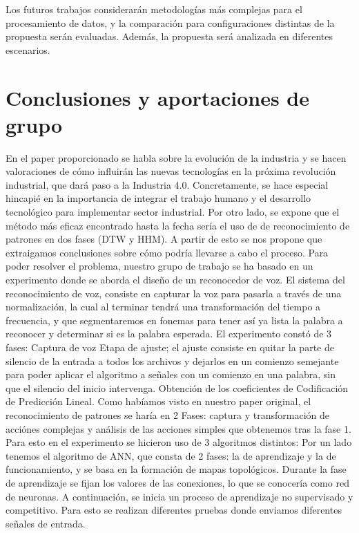 \documentclass{article}
\begin{document}
  Los futuros trabajos considerarán metodologías más complejas para el procesamiento de datos, y la comparación para configuraciones distintas de la propuesta serán evaluadas.
Además, la propuesta será analizada en diferentes escenarios.

\section {Conclusiones y aportaciones de grupo}
En el paper proporcionado se habla sobre la evolución de la industria y se hacen valoraciones de cómo influirán las nuevas tecnologías en la próxima revolución industrial, que dará paso a la Industria 4.0.
 Concretamente, se hace especial hincapié en la importancia de integrar el trabajo humano y el desarrollo tecnológico para implementar sector industrial.
Por otro lado, se expone que el método más eficaz encontrado hasta la fecha sería el uso de de reconocimiento de patrones en dos fases (DTW y HHM).
A partir de esto se nos propone que extraigamos conclusiones sobre cómo podría llevarse a cabo el proceso. 
Para poder resolver el problema, nuestro grupo de trabajo se ha basado en un experimento donde se aborda el diseño de un reconocedor de voz. 
El sistema del reconocimiento de voz, consiste en capturar la voz para pasarla a través de una normalización, la cual al terminar tendrá una transformación del tiempo a frecuencia, y que segmentaremos en fonemas para tener así ya lista la palabra a reconocer y determinar si es la palabra esperada. 
El experimento constó de 3 fases: 
Captura de voz
Etapa de ajuste; el ajuste consiste en quitar la parte de silencio de la entrada a todos los archivos y dejarlos en un comienzo semejante para poder aplicar el algoritmo a señales con un comienzo en una palabra, sin que el silencio del inicio intervenga. 
Obtención de los  coeficientes de Codificación de Predicción Lineal.
Como habíamos visto en nuestro paper original, el reconocimiento de patrones se haría en 2 Fases: captura y transformación de acciónes complejas y análisis de las acciones simples que obtenemos tras la fase 1. 
Para esto en el experimento se hicieron uso de 3 algoritmos distintos: 
Por un lado tenemos el algoritmo de ANN, que consta de 2 fases: la de aprendizaje y la de funcionamiento, y se basa en la formación de mapas topológicos. 
Durante la fase de aprendizaje se fijan los valores de las conexiones, lo que se conocería como red de neuronas. A continuación, se inicia un proceso de aprendizaje no supervisado y competitivo. 
Para esto se realizan diferentes pruebas donde enviamos diferentes señales de entrada. 
\end{document}
